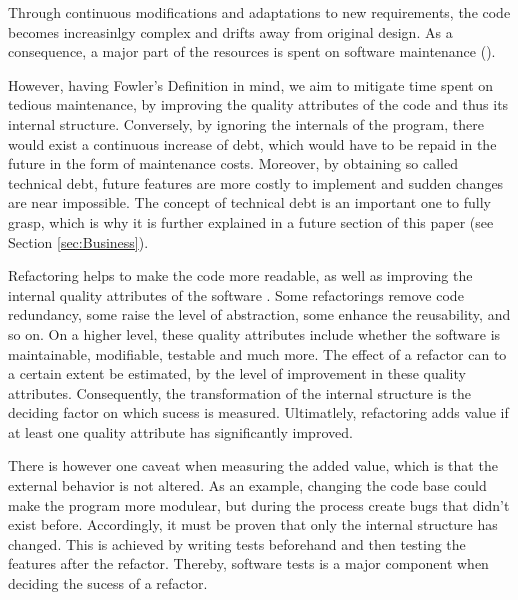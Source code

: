 Through continuous modifications and adaptations to new requirements, the code becomes increasinlgy complex and drifts away from original design. 
As a consequence, 
	a major part of the resources is spent on software maintenance (\cite[p.~1]{mens2003}). 

However, having Fowler's Definition in mind, 
	we aim to mitigate time spent on tedious maintenance, 
	by improving the quality attributes of the code and thus its internal structure.
Conversely, by ignoring the internals of the program, 
	there would exist a continuous increase of debt, 
	which would have to be repaid in the future in the form of maintenance costs.
Moreover, by obtaining so called technical debt, 
	future features are more costly to implement and sudden changes are near impossible. 
The concept of technical debt is an important one to fully grasp, 
	which is why it is further explained in a future section of this paper 
(see Section \ref{sec:Business}).
	

Refactoring helps to make the code more readable, 
	as well as improving the internal quality attributes of the software \textcite[p.~129]{mens2004}. 
Some refactorings remove code redundancy, 
	some raise the level of abstraction, 
	some enhance the reusability, and so on.
On a higher level, these quality attributes include whether the software is maintainable, modifiable, testable and much more.
The effect of a refactor can to a certain extent be estimated, 
	by the level of improvement in these quality attributes.
Consequently, the transformation of the internal structure 
	is the deciding factor on which sucess is measured.
Ultimatlely, refactoring adds value if at least one quality attribute has significantly improved.

There is however one caveat when measuring the added value,
	which is that the external behavior is not altered. 
As an example, changing the code base could make the program more modulear, 
	but during the process create bugs that didn't exist before. 
Accordingly, it must be proven that only the internal structure has changed.
This is achieved by writing tests beforehand and then testing the features after the refactor.
Thereby, software tests is a major component when deciding the sucess of a refactor.







